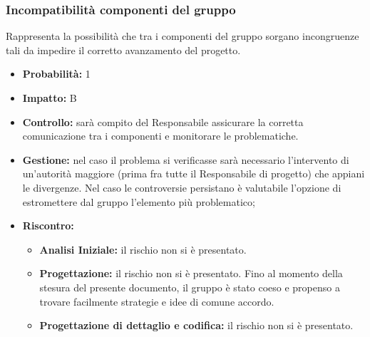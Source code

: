 \documentclass[a4paper,11pt]{article}
\begin{document}
		\subsubsection{Incompatibilità componenti del gruppo}
		Rappresenta la possibilità che tra i componenti del gruppo sorgano incongruenze tali da impedire il corretto avanzamento del progetto.
		\begin{itemize}
		\item \textbf{Probabilità:} 1
		\item \textbf{Impatto:} B
		\item \textbf{Controllo:} sarà compito del Responsabile assicurare la corretta comunicazione tra i componenti e monitorare le problematiche.
		\item \textbf{Gestione:} nel caso il problema si verificasse sarà necessario l'intervento di un'autorità maggiore (prima fra tutte il Responsabile di progetto) che appiani le divergenze. Nel caso le controversie persistano è valutabile l'opzione di estromettere dal gruppo l'elemento più problematico;
		\item \textbf{Riscontro:}
			\begin{itemize}
				\item\textbf{Analisi Iniziale:} il rischio non si è presentato.
				\item\textbf{Progettazione:} il rischio non si è presentato. Fino al momento della stesura del presente documento, il gruppo è stato coeso e propenso a trovare facilmente strategie e idee di comune accordo.
				\item\textbf{Progettazione di dettaglio e codifica:} il rischio non si è presentato. 
			\end{itemize}
		\end{itemize}
\end{document}
